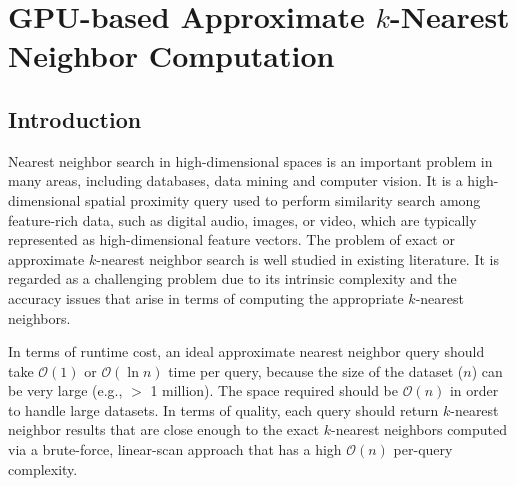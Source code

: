 \chapter{GPU-based Approximate $k$-Nearest Neighbor Computation} 
\label{chp:GLSH}

\section{Introduction}
Nearest neighbor search in high-dimensional spaces is an important problem in many areas, including databases, data mining and computer vision. It is a high-dimensional spatial proximity query used to perform similarity search among feature-rich data, such as digital audio, images, or video, which are typically represented as high-dimensional feature vectors. The problem of exact or approximate $k$-nearest neighbor search is well studied in existing literature. It is regarded as a challenging problem due to its intrinsic complexity and the accuracy issues that arise in terms of computing the appropriate $k$-nearest neighbors.

In terms of runtime cost, an ideal approximate nearest neighbor query should take $\mathcal O(1)$ or $\mathcal O(\ln n)$ time per query, because the size of the dataset ($n$) can be very large (e.g., $>$ 1 million). The space required should be $\mathcal O(n)$ in order to handle large datasets. In terms of quality, each query should return $k$-nearest neighbor results that are close enough to the exact $k$-nearest neighbors computed via a brute-force, linear-scan approach that has a high $\mathcal O(n)$ per-query complexity.

